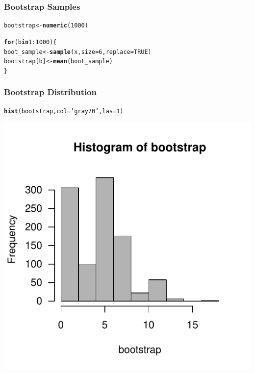 \documentclass[12pt]{beamer}\usepackage[]{graphicx}\usepackage[]{color}
\makeatletter
\newcommand{\hlnum}[1]{\textcolor[rgb]{0.686,0.059,0.569}{#1}}%
\newcommand{\hlstr}[1]{\textcolor[rgb]{0.192,0.494,0.8}{#1}}%
\newcommand{\hlopt}[1]{\textcolor[rgb]{0,0,0}{#1}}%
\newcommand{\hlstd}[1]{\textcolor[rgb]{0.345,0.345,0.345}{#1}}%
\newcommand{\hlkwa}[1]{\textcolor[rgb]{0.161,0.373,0.58}{\textbf{#1}}}%
\newcommand{\hlkwb}[1]{\textcolor[rgb]{0.69,0.353,0.396}{#1}}%
\newcommand{\hlkwc}[1]{\textcolor[rgb]{0.333,0.667,0.333}{#1}}%
\newcommand{\hlkwd}[1]{\textcolor[rgb]{0.737,0.353,0.396}{\textbf{#1}}}%
\newenvironment{kframe}{%
 \def\at@end@of@kframe{}%
 \ifinner\ifhmode%
  \def\at@end@of@kframe{\end{minipage}}%
  \begin{minipage}{\columnwidth}%
 \fi\fi%
 \def\FrameCommand##1{\hskip\@totalleftmargin \hskip-\fboxsep
 \colorbox{shadecolor}{##1}\hskip-\fboxsep
     \hskip-\linewidth \hskip-\@totalleftmargin \hskip\columnwidth}%
 \MakeFramed {\advance\hsize-\width
   \@totalleftmargin\z@ \linewidth\hsize
   \@setminipage}}%
 {\par\unskip\endMakeFramed%
 \at@end@of@kframe}
\newenvironment{knitrout}{}{} %
\makeatother
\begin{document}

\begin{frame}[fragile]
\frametitle{Bootstrap Samples}

\begin{knitrout}\footnotesize
{}\color{fgcolor}\begin{kframe}
\begin{alltt}
\hlstd{bootstrap} \hlkwb{<-} \hlkwd{numeric}\hlstd{(}\hlnum{1000}\hlstd{)}

\hlkwa{for} \hlstd{(b} \hlkwa{in} \hlnum{1}\hlopt{:}\hlnum{1000}\hlstd{) \{}
  \hlstd{boot_sample} \hlkwb{<-} \hlkwd{sample}\hlstd{(x,} \hlkwc{size} \hlstd{=} \hlnum{6}\hlstd{,} \hlkwc{replace} \hlstd{=} \hlnum{TRUE}\hlstd{)}
  \hlstd{bootstrap[b]} \hlkwb{<-} \hlkwd{mean}\hlstd{(boot_sample)}
\hlstd{\}}
\end{alltt}
\end{kframe}
\end{knitrout}

\end{frame}


\begin{frame}[fragile]
\frametitle{Bootstrap Distribution}
\begin{knitrout}\tiny
{}\color{fgcolor}\begin{kframe}
\begin{alltt}
\hlkwd{hist}\hlstd{(bootstrap,} \hlkwc{col} \hlstd{=} \hlstr{'gray70'}\hlstd{,} \hlkwc{las} \hlstd{=} \hlnum{1}\hlstd{)}
\end{alltt}
\end{kframe}

{\centering \includegraphics[width=.6\linewidth,height=.6\linewidth]{figure/unnamed-chunk-10-1} 

}



\end{knitrout}

\end{frame}
\end{document}
